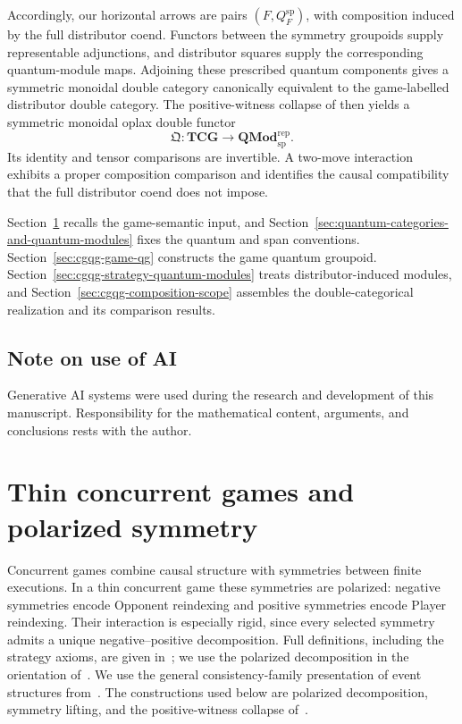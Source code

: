 \documentclass[oneside]{article}
\theoremstyle{plain}
\theoremstyle{definition}
\theoremstyle{remark}
\begin{document}
Accordingly, our horizontal arrows are pairs \((F,Q_F^{\mathrm{sp}})\),
with composition induced by the full distributor coend. Functors between
the symmetry groupoids supply representable adjunctions, and distributor
squares supply the corresponding quantum-module maps. Adjoining these
prescribed quantum components gives a symmetric monoidal double category
canonically equivalent to the game-labelled distributor double category.
The positive-witness collapse of
\cite[Theorem~5.15]{ClairambaultOlimpieriPaquet2025} then yields a
symmetric monoidal oplax double functor
\[
 \mathfrak Q:\mathbf{TCG}\longrightarrow
 \mathbf{QMod}^{\mathrm{rep}}_{\mathrm{sp}}.
\]
Its identity and tensor comparisons are invertible. A two-move
interaction exhibits a proper composition comparison and identifies the
causal compatibility that the full distributor coend does not impose.

Section~\ref{sec:cgqg-strict-background} recalls the game-semantic input, and
Section~\ref{sec:quantum-categories-and-quantum-modules} fixes the quantum
and span conventions. Section~\ref{sec:cgqg-game-qg} constructs the game
quantum groupoid. Section~\ref{sec:cgqg-strategy-quantum-modules} treats
distributor-induced modules, and
Section~\ref{sec:cgqg-composition-scope} assembles the double-categorical
realization and its comparison results.

\subsection*{Note on use of AI}
Generative AI systems were used during the research and development of this manuscript. Responsibility for the mathematical content,
arguments, and conclusions rests with the author.

\section{Thin concurrent games and polarized symmetry}
\label{sec:cgqg-strict-background}

Concurrent games combine causal structure with symmetries between finite executions. In a thin concurrent game these symmetries are polarized: negative symmetries encode Opponent reindexing and positive symmetries encode Player reindexing. Their interaction is especially rigid, since every selected symmetry admits a unique negative--positive decomposition. Full definitions, including the strategy axioms, are given in~\cite{CastellanClairambaultWinskel2019,ClairambaultOlimpieriPaquet2025}; we use the polarized decomposition in the orientation of~\cite[Lemma~5.3]{ClairambaultOlimpieriPaquet2025}. We use the general consistency-family presentation of event structures from~\cite{CastellanClairambaultWinskel2019}. The constructions used below are polarized decomposition, symmetry lifting, and the positive-witness collapse of~\cite{ClairambaultOlimpieriPaquet2025}.
\end{document}
